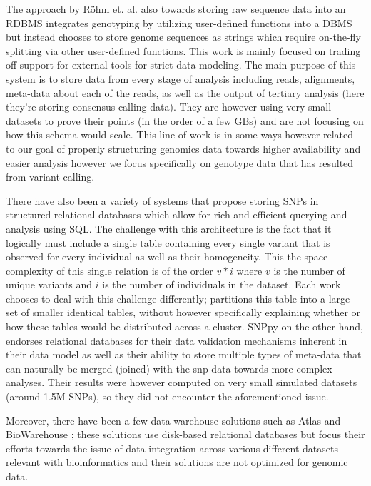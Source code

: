 \documentclass[conference,twocolumn,10pt]{IEEEtran}
\begin{document}
The approach by R{\"o}hm et. al. \cite{rohm2009data} also towards storing raw sequence data into an RDBMS integrates genotyping by utilizing user-defined functions into a DBMS but instead chooses to store genome sequences as strings which require on-the-fly splitting via other user-defined functions. This work is mainly focused on trading off support for external tools for strict data modeling. The main purpose of this system is to store data from every stage of analysis including reads, alignments, meta-data about each of the reads, as well as the output of tertiary analysis (here they're storing consensus calling data). They are however using very small datasets to prove their points (in the order of a few GBs) and are not focusing on how this schema would scale. This line of work is in some ways however related to our goal of properly structuring genomics data towards higher availability and easier analysis however we focus specifically on genotype data that has resulted from variant calling.

There have also been a variety of systems \cite{bouffard2010damming, mitha2011snppy} that propose storing SNPs in structured relational databases which allow for rich and efficient querying and analysis using SQL. The challenge with this architecture is the fact that it logically must include a single table containing every single variant that is observed for every individual as well as their homogeneity. This the space complexity of this single relation is of the order $v * i$ where $v$ is the number of unique variants and $i$ is the number of individuals in the dataset. Each work chooses to deal with this challenge differently; \cite{bouffard2010damming} partitions this table into a large set of smaller identical tables, without however specifically explaining whether or how these tables would be distributed across a cluster. SNPpy \cite{mitha2011snppy} on the other hand, endorses relational databases for their data validation mechanisms inherent in their data model as well as their ability to store multiple types of meta-data that can naturally be merged (joined) with the snp data towards more complex analyses. Their results were however computed on very small simulated datasets (around 1.5M SNPs), so they did not encounter the aforementioned issue.

Moreover, there have been a few data warehouse solutions such as Atlas \cite{shah2005atlas} and BioWarehouse \cite{lee2006biowarehouse}; these solutions use disk-based relational databases but focus their efforts towards the issue of data integration across various different datasets relevant with bioinformatics and their solutions are not optimized for genomic data.
\end{document}
